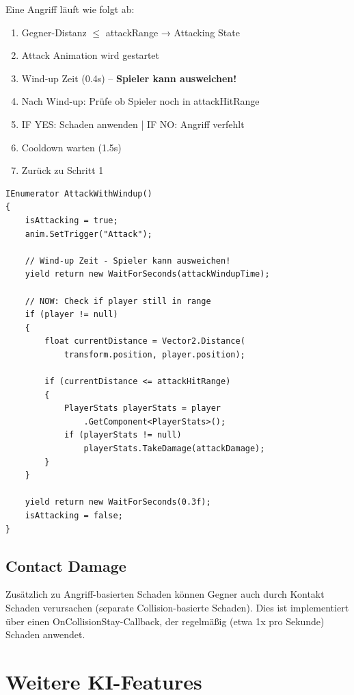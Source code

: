 \documentclass[
  a4paper,
  11pt,
  ngerman,
  parskip=half,
  bibliography=totoc,
  listof=totoc
]{scrreprt}
\begin{document}
Eine Angriff läuft wie folgt ab:

\begin{enumerate}
    \item Gegner-Distanz $\leq$ attackRange → Attacking State
    \item Attack Animation wird gestartet
    \item Wind-up Zeit (0.4s) -- \textbf{Spieler kann ausweichen!}
    \item Nach Wind-up: Prüfe ob Spieler noch in attackHitRange
    \item IF YES: Schaden anwenden | IF NO: Angriff verfehlt
    \item Cooldown warten (1.5s)
    \item Zurück zu Schritt 1
\end{enumerate}

\begin{lstlisting}[caption={Attack mit Wind-up (Enemy\_Movement.cs)}, label=lst:attack_windup]
IEnumerator AttackWithWindup()
{
    isAttacking = true;
    anim.SetTrigger("Attack");

    // Wind-up Zeit - Spieler kann ausweichen!
    yield return new WaitForSeconds(attackWindupTime);

    // NOW: Check if player still in range
    if (player != null)
    {
        float currentDistance = Vector2.Distance(
            transform.position, player.position);

        if (currentDistance <= attackHitRange)
        {
            PlayerStats playerStats = player
                .GetComponent<PlayerStats>();
            if (playerStats != null)
                playerStats.TakeDamage(attackDamage);
        }
    }

    yield return new WaitForSeconds(0.3f);
    isAttacking = false;
}
\end{lstlisting}

\subsection{Contact Damage}

Zusätzlich zu Angriff-basierten Schaden können Gegner auch durch Kontakt Schaden verursachen (separate Collision-basierte Schaden). Dies ist implementiert über einen OnCollisionStay-Callback, der regelmäßig (etwa 1x pro Sekunde) Schaden anwendet.

\section{Weitere KI-Features}
\end{document}
